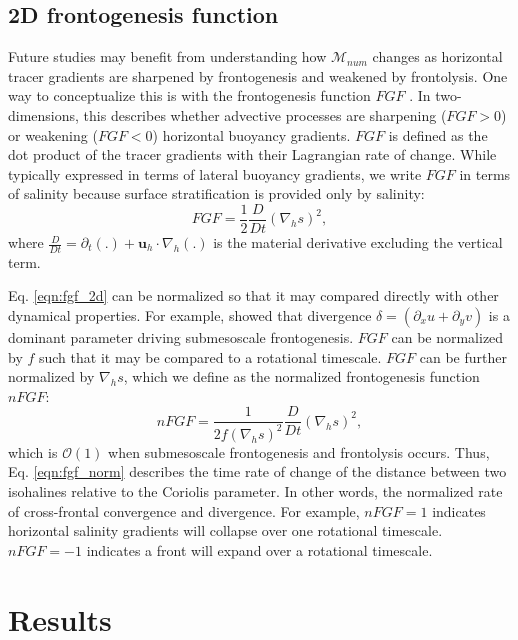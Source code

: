 \subsection{2D frontogenesis function}
Future studies may benefit from understanding how $\mathcal{M}_{num}$ changes as horizontal tracer gradients are sharpened by frontogenesis and weakened by frontolysis. One way to conceptualize this is with the frontogenesis function $FGF$ \citep{hoskins1982mathematical, mcwilliams2021oceanic}. In two-dimensions, this describes whether advective processes are sharpening ($FGF>0$) or weakening ($FGF<0$) horizontal buoyancy gradients. $FGF$ is defined as the dot product of the tracer gradients with their Lagrangian rate of change. While typically expressed in terms of lateral buoyancy gradients, we write $FGF$ in terms of salinity because surface stratification is provided only by salinity:
\begin{equation} \label{eqn:fgf_2d}
        FGF = \frac{1}{2}\frac{D}{Dt} \left(\nabla_h s \right)^2,
\end{equation}
where $\frac{D}{Dt} = \partial_t(.) + \mathbf{u}_h \cdot \nabla_h (.)$ is the material derivative excluding the vertical term. 

Eq. \ref{eqn:fgf_2d} can be normalized so that it may compared directly with other dynamical properties. For example, \citet{barkan2019role} showed that divergence $\delta  = (\partial_x u + \partial_y v)$ is a dominant parameter driving submesoscale frontogenesis. $FGF$ can be normalized by $f$ such that it may be compared to a rotational timescale. $FGF$ can be further normalized by $\nabla_h s$, which we define as the normalized frontogenesis function $nFGF$:
\begin{equation} \label{eqn:fgf_norm}
    nFGF = \frac{1}{2f \left(\nabla_h s \right)^2}\frac{D}{Dt} \left(\nabla_h s \right)^2,
\end{equation}
which is $\mathcal{O}(1)$ when submesoscale frontogenesis and frontolysis occurs. Thus, Eq. \ref{eqn:fgf_norm} describes the time rate of change of the distance between two isohalines relative to the Coriolis parameter. In other words, the normalized rate of cross-frontal convergence and divergence. For example, $nFGF=1$ indicates horizontal salinity gradients will collapse over one rotational timescale. $nFGF = -1$ indicates a front will expand over a rotational timescale. 

\section{Results} \label{sec:results}
